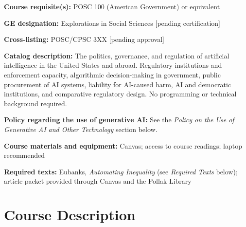 \documentclass[12pt]{article}
\begin{document}
\vspace{0.5em}
\begin{flatlist}
\item \textbf{Course requisite(s):} POSC 100 (American Government) or equivalent
\item \textbf{GE designation:} Explorations in Social Sciences [pending certification]
\item \textbf{Cross-listing:} POSC/CPSC 3XX [pending approval]
\item \textbf{Catalog description:} The politics, governance, and regulation of artificial intelligence in the United States and abroad. Regulatory institutions and enforcement capacity, algorithmic decision-making in government, public procurement of AI systems, liability for AI-caused harm, AI and democratic institutions, and comparative regulatory design. No programming or technical background required.
\item \textbf{Policy regarding the use of generative AI:} See the \emph{Policy on the Use of Generative AI and Other Technology} section below.
\item \textbf{Course materials and equipment:} Canvas; access to course readings; laptop recommended
\item \textbf{Required texts:} Eubanks, \emph{Automating Inequality} (see \emph{Required Texts} below); article packet provided through Canvas and the Pollak Library
\end{flatlist}

\section*{Course Description}
\end{document}
